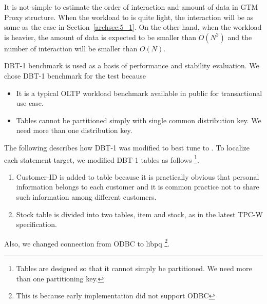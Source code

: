   It is not simple to estimate the order of interaction and amount of data in
  GTM Proxy structure.
  When the workload to \XC{} is quite light, the interaction will be as same as the case in
  Section~\ref{archsec:5_1}.
  On the other hand, when the workload is heavier, the amount of data is expected to be
  smaller than $O(N^2)$ and the number of interaction will be smaller than $O(N)$.






  DBT-1 benchmark is used as a basis of performance and stability evaluation.
  We chose DBT-1 benchmark for the test because
  
  \begin{itemize}
	  \item It is a typical OLTP workload benchmark available in public for transactional use case.
	  \item Tables cannot be partitioned simply with single common distribution key.
	  		We need more than one distribution key.
  \end{itemize}
  
  The following describes how DBT-1 was modified to best tune to \XC.
  To localize each statement target, we modified DBT-1 tables as follows%
  \footnote{
  	Tables are designed so that it cannot simply be partitioned.
	We need more than one partitioning key.
  }.
  
  \begin{enumerate}
	  \item Customer-ID is added to  table because it is practically
	  		obvious that personal information belongs to each customer and
			it is common practice not to share such information among different customers.
	  \item Stock table is divided into two tables, item and stock, as in the latest
	  		TPC-W specification.
  \end{enumerate}
  
  Also, we changed connection from ODBC to libpq%
  \footnote{
  	This is because early \XC{} implementation did not support ODBC
  }.
  
